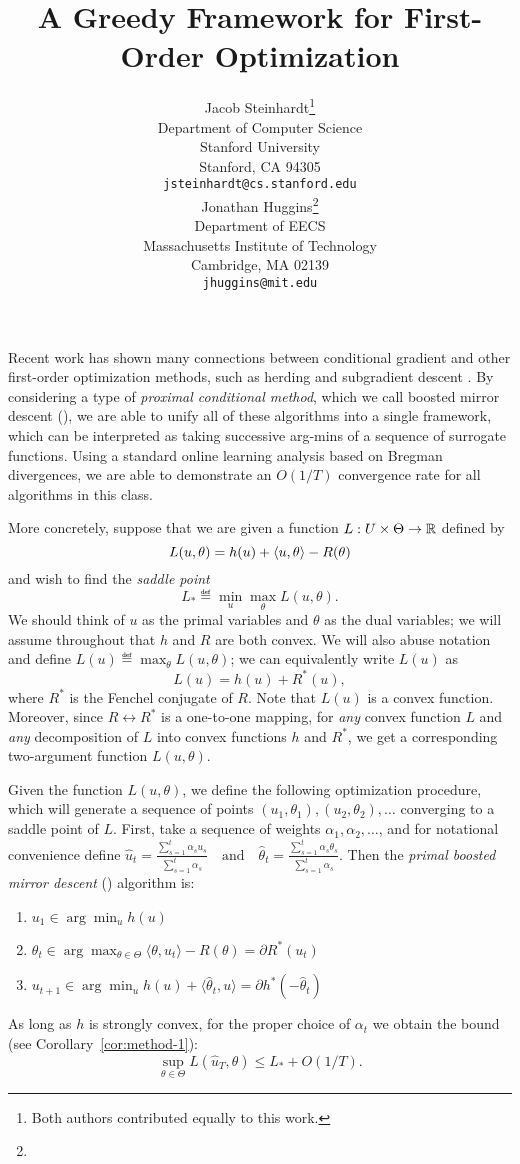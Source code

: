 \documentclass{article} %
\title{A Greedy Framework for First-Order Optimization}
\author{
Jacob Steinhardt\thanks{Both authors contributed equally to this work.} \\
Department of Computer Science\\
Stanford University\\
Stanford, CA 94305 \\
\texttt{jsteinhardt@cs.stanford.edu} \\
\And
Jonathan Huggins\footnote[1]{}\\
Department of EECS \\
Massachusetts Institute of Technology \\
Cambridge, MA 02139 \\
\texttt{jhuggins@mit.edu}
}
\begin{document}
\maketitle

Recent work has shown many connections between conditional gradient 
and other first-order optimization methods, such as herding \cite{Bach:2012a} 
and subgradient descent \cite{Bach:2012b}. By considering a type of 
\emph{proximal conditional method}, which we call boosted mirror 
descent (\bmd), we are able to unify all of these algorithms into 
a single framework, which can be interpreted as taking successive 
arg-mins of a sequence of surrogate functions. Using a standard 
online learning analysis based on Bregman divergences, we are 
able to demonstrate an $O(1/T)$ convergence rate for all algorithms 
in this class. 

More concretely, suppose that we are given a function 
$L : U \times \Theta \to \mathbb{R}$ defined by
\[ L(u, \theta) = h(u) + \left\langle u, \theta \right\rangle - R(\theta) \]
and wish to find the \emph{saddle point} 
\[ L_* \eqdef \min_{u} \max_{\theta} L(u, \theta). \]
We should think of $u$ as the primal variables and $\theta$ 
as the dual variables; we will assume throughout that 
$h$ and $R$ are both convex. We will also abuse notation 
and define $L(u) \eqdef \max_{\theta} L(u, \theta)$; we 
can equivalently write $L(u)$ as 
\[ L(u) = h(u) + R^*(u), \]
where $R^*$ is the Fenchel conjugate of $R$. Note that 
$L(u)$ is a convex function. Moreover, since 
$R \leftrightarrow R^*$ is a one-to-one mapping, for 
\emph{any} convex function $L$ and \emph{any} decomposition 
of $L$ into convex functions $h$ and $R^*$, we get a 
corresponding two-argument function $L(u, \theta)$. 

Given the function $L(u, \theta)$, we define the following 
optimization procedure, which will generate a sequence of 
points $(u_1,\theta_1), (u_2, \theta_2), \ldots$ converging 
to a saddle point of $L$. First, take a sequence of weights
$\alpha_1, \alpha_2, \ldots$, and for notational convenience 
define
\(
\hat{u}_t = \frac{\sum_{s=1}^t \alpha_su_s}{\sum_{s=1}^t \alpha_s} 
\quad \text{and} \quad 
\hat{\theta}_t = \frac{\sum_{s=1}^t \alpha_s\theta_s}{\sum_{s=1}^t \alpha_s}.
\)
Then 
the {\em primal boosted mirror descent} (\primal) algorithm is:
\begin{enumerate}
\item $u_1 \in \arg\min_u h(u)$
\item $\theta_{t} \in \arg\max_{\theta \in \Theta} \langle \theta, u_t \rangle - R(\theta) = \partial R^{*}(u_{t})$
\item $u_{t+1} \in \arg\min_{u} h(u) + \langle \hat{\theta}_t, u \rangle = \partial h^{*}(-\hat\theta_{t})$
\end{enumerate}
As long as $h$ is strongly convex, for the proper choice of $\alpha_{t}$ we 
obtain the bound (see Corollary~\ref{cor:method-1}):
\begin{equation}
\sup_{\theta \in \Theta} L(\hat{u}_T, \theta) \leq L_{*} + O(1/T).
\end{equation}
\end{document}
